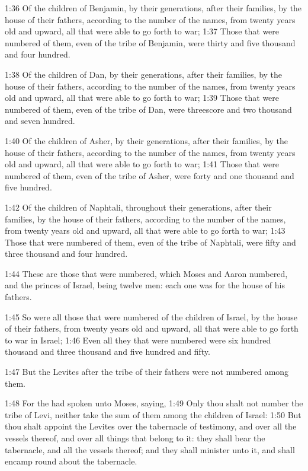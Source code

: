 1:36 Of the children of Benjamin, by their generations, after their families, by the house of their fathers, according to the number of the names, from twenty years old and upward, all that were able to go forth to war; 1:37 Those that were numbered of them, even of the tribe of Benjamin, were thirty and five thousand and four hundred.

1:38 Of the children of Dan, by their generations, after their families, by the house of their fathers, according to the number of the names, from twenty years old and upward, all that were able to go forth to war; 1:39 Those that were numbered of them, even of the tribe of Dan, were threescore and two thousand and seven hundred.

1:40 Of the children of Asher, by their generations, after their families, by the house of their fathers, according to the number of the names, from twenty years old and upward, all that were able to go forth to war; 1:41 Those that were numbered of them, even of the tribe of Asher, were forty and one thousand and five hundred.

1:42 Of the children of Naphtali, throughout their generations, after their families, by the house of their fathers, according to the number of the names, from twenty years old and upward, all that were able to go forth to war; 1:43 Those that were numbered of them, even of the tribe of Naphtali, were fifty and three thousand and four hundred.

1:44 These are those that were numbered, which Moses and Aaron numbered, and the princes of Israel, being twelve men: each one was for the house of his fathers.

1:45 So were all those that were numbered of the children of Israel, by the house of their fathers, from twenty years old and upward, all that were able to go forth to war in Israel; 1:46 Even all they that were numbered were six hundred thousand and three thousand and five hundred and fifty.

1:47 But the Levites after the tribe of their fathers were not numbered among them.

1:48 For the \LORD had spoken unto Moses, saying, 1:49 Only thou shalt not number the tribe of Levi, neither take the sum of them among the children of Israel: 1:50 But thou shalt appoint the Levites over the tabernacle of testimony, and over all the vessels thereof, and over all things that belong to it: they shall bear the tabernacle, and all the vessels thereof; and they shall minister unto it, and shall encamp round about the tabernacle.

